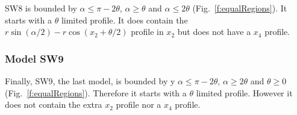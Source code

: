 SW8 is bounded by $\alpha \le \pi - 2\theta$, $\alpha \ge \theta$ and $\alpha \le 2\theta$ (Fig.~\ref{f:equalRegions}). It starts with a $\theta$ limited profile. It does contain the $r\sin(\alpha/2) - r\cos(x_2 + \theta/2)$ profile in $x_2$ but does not have a $x_4$ profile.

\subsubsection{Model SW9} \label{SW9}

Finally, SW9, the last model, is bounded by y $\alpha \le \pi - 2\theta$, $\alpha \ge 2\theta$ and $\theta \ge 0$ (Fig.~\ref{f:equalRegions}). Therefore it starts with a $\theta$ limited profile. However it does not contain the extra $x_2$ profile nor a $x_4$ profile.








